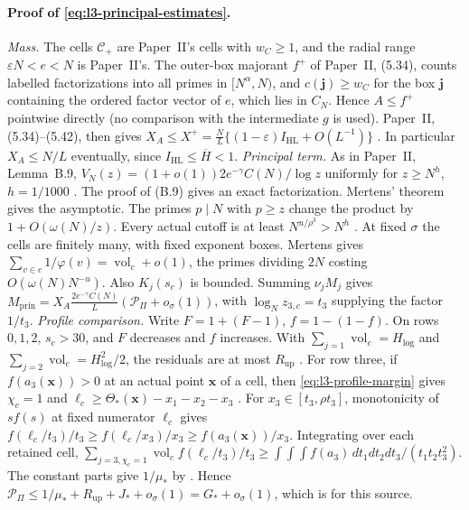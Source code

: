 \paragraph{Proof of \eqref{eq:l3-principal-estimates}.}
\emph{Mass.} The cells $\mathcal C_+$ are Paper~II's cells with $w_C\ge1$,
and the radial range $\varepsilon N<e<N$ is Paper~II's. The outer-box
majorant $f^+$ of Paper~II, (5.34), counts labelled factorizations into
all primes in $[N^\alpha,N)$, and $c(\mathbf j)\ge w_C$ for the box
$\mathbf j$ containing the ordered factor vector of $e$, which lies in
$C_N$. Hence $A\le f^+$ pointwise directly (no comparison with the
intermediate $g$ is used). Paper~II, (5.34)--(5.42), then gives
$X_A\le X^+=\frac NL\{(1-\varepsilon)I_{\mathrm{HL}}+O(L^{-1})\}$
\cite[(5.32), (5.34), (5.42)]{PaperII}. In particular $X_A\le N/L$
eventually, since $I_{\mathrm{HL}}\le\overline H<1$.
\emph{Principal term.} As in Paper~II, Lemma~B.9,
$V_N(z)=(1+o(1))2e^{-\gamma}C(N)/\log z$ uniformly for $z\ge N^h$,
$h=1/1000$ \cite[(B.9) and its proof]{PaperII}. The proof of (B.9) gives
an exact factorization. Mertens' theorem gives the asymptotic. The
primes $p\mid N$ with $p\ge z$ change the product by $1+O(\omega(N)/z)$.
Every actual cutoff is at least $N^{u/\rho^3}>N^h$ \cite[Lemma~B.8]{PaperII}. At fixed $\sigma$ the cells are
finitely many, with fixed exponent boxes. Mertens gives
$\sum_{v\in c}1/\varphi(v)=\operatorname{vol}_c+o(1)$, the primes
dividing $2N$ costing $O(\omega(N)N^{-u})$. Also $K_j(s_c)$ is bounded.
Summing $\nu_jM_j$ gives
$M_{\mathrm{prin}}=X_A\frac{2e^{-\gamma}C(N)}L(\mathcal P_\Pi+o_\sigma(1))$,
with $\log_Nz_{3,c}=t_3$ supplying the factor $1/t_3$.
\emph{Profile comparison.} Write $F=1+(F-1)$, $f=1-(1-f)$.
On rows $0,1,2$, $s_c>30$, and $F$ decreases and $f$ increases. With
$\sum_{j=1}\operatorname{vol}_c=H_{\log}$ and
$\sum_{j=2}\operatorname{vol}_c=H_{\log}^2/2$, the residuals are at most
$R_{\mathrm{up}}$ \cite[(4.73)]{PaperII}. For row three, if
$f(a_3(\mathbf x))>0$ at an actual point $\mathbf x$ of a cell, then
\eqref{eq:l3-profile-margin} gives $\chi_c=1$ and
$\ell_c\ge\Theta_*(\mathbf x)-x_1-x_2-x_3$ \cite[(4.72) and the two
paragraphs after it]{PaperII}. For $x_3\in[t_3,\rho t_3]$, monotonicity of
$sf(s)$ at fixed numerator $\ell_c$ gives
$f(\ell_c/t_3)/t_3\ge f(\ell_c/x_3)/x_3\ge f(a_3(\mathbf x))/x_3$.
Integrating over each retained cell,
$\sum_{j=3,\chi_c=1}\operatorname{vol}_cf(\ell_c/t_3)/t_3
 \ge\int\!\!\int\!\!\int f(a_3)\,dt_1dt_2dt_3/(t_1t_2t_3^2)$.
The constant parts give $1/\mu_*$ by \cite[(4.74)]{PaperII}. Hence
$\mathcal P_\Pi\le1/\mu_*+R_{\mathrm{up}}+J_*+o_\sigma(1)=G_*+o_\sigma(1)$,
which is \cite[(4.75)]{PaperII} for this source.

